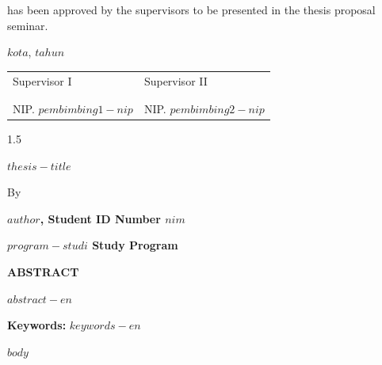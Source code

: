 \documentclass[12pt,a4paper,oneside]{book}
\newcommand{\thesistitle}{$thesis-title$}
\newcommand{\studentname}{$author$}
\newcommand{\studentnim}{$nim$}
\newcommand{\programstudi}{$program-studi$}
\newcommand{\tahun}{$tahun$}
\newcommand{\kota}{$kota$}
\newcommand{\pembimbingsatu}{$pembimbing1-nama$}
\newcommand{\pembimbingsatunip}{$pembimbing1-nip$}
\newcommand{\pembimbingdua}{$pembimbing2-nama$}
\newcommand{\pembimbingduanip}{$pembimbing2-nip$}
\begin{document}
\noindent has been approved by the supervisors to be presented in the thesis proposal seminar.
\vspace{1.5cm}

\noindent \kota, \tahun
\vspace{0.3cm}

\noindent\begin{tabular}{@{}p{} @{\hfill} p{}@{}}
\centering Supervisor I & \centering Supervisor II \tabularnewline
\\[2.5cm]
\centering {\small\underline{\pembimbingsatu}} & \centering {\small\underline{\pembimbingdua}} \tabularnewline
\centering NIP. \pembimbingsatunip & \centering NIP. \pembimbingduanip
\end{tabular}

\newpage
\thispagestyle{plain}

\begin{center}
\begin{spacing}{1.5}
{\bfseries\MakeUppercase{\thesistitle}\par}
\end{spacing}
\vspace{0.3cm}
By\par
\vspace{0.2cm}
{\bfseries \studentname, Student ID Number \studentnim\par}
{\bfseries \programstudi{} Study Program\par}
\vspace{0.5cm}
{\bfseries ABSTRACT\par}
\end{center}
\vspace{0.2cm}

\begin{singlespace}
\noindent $abstract-en$

\vspace{0.3cm}
\noindent\textbf{Keywords:} $keywords-en$
\end{singlespace}

\newpage
\renewcommand{\contentsname}{TABLE OF CONTENTS}
\tableofcontents

\newpage
\renewcommand{\listfigurename}{LIST OF FIGURES}
\listoffigures
\newpage
\renewcommand{\listtablename}{LIST OF TABLES}
\listoftables

\mainmatter
\pagestyle{plain}

$body$
\end{document}
